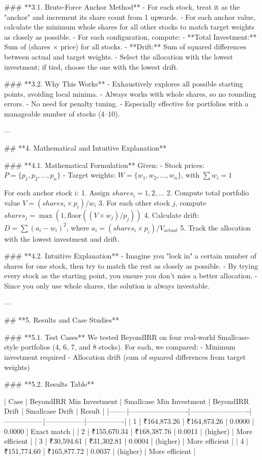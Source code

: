 ### **3.1. Brute-Force Anchor Method**
- For each stock, treat it as the "anchor" and increment its share count from 1 upwards.
- For each anchor value, calculate the minimum whole shares for all other stocks to match target weights as closely as possible.
- For each configuration, compute:
  - **Total Investment:** Sum of (shares × price) for all stocks.
  - **Drift:** Sum of squared differences between actual and target weights.
- Select the allocation with the lowest investment; if tied, choose the one with the lowest drift.

### **3.2. Why This Works**
- Exhaustively explores all possible starting points, avoiding local minima.
- Always works with whole shares, so no rounding errors.
- No need for penalty tuning.
- Especially effective for portfolios with a manageable number of stocks (4–10).

---

## **4. Mathematical and Intuitive Explanation**

### **4.1. Mathematical Formulation**
Given:
- Stock prices: \( P = \{p_1, p_2, ..., p_n\} \)
- Target weights: \( W = \{w_1, w_2, ..., w_n\} \), with \( \sum w_i = 1 \)

For each anchor stock \( i \):
1. Assign \( shares_i = 1, 2, ... \)
2. Compute total portfolio value \( V = (shares_i \times p_i) / w_i \)
3. For each other stock \( j \), compute \( shares_j = \max(1, \text{floor}((V \times w_j) / p_j)) \)
4. Calculate drift: \( D = \sum (a_i - w_i)^2 \), where \( a_i = (shares_i \times p_i) / V_{actual} \)
5. Track the allocation with the lowest investment and drift.

### **4.2. Intuitive Explanation**
- Imagine you "lock in" a certain number of shares for one stock, then try to match the rest as closely as possible.
- By trying every stock as the starting point, you ensure you don't miss a better allocation.
- Since you only use whole shares, the solution is always investable.

---

## **5. Results and Case Studies**

### **5.1. Test Cases**
We tested BeyondIRR on four real-world Smallcase-style portfolios (4, 6, 7, and 8 stocks). For each, we compared:
- Minimum investment required
- Allocation drift (sum of squared differences from target weights)

### **5.2. Results Table**

| Case   | BeyondIRR Min Investment | Smallcase Min Investment | BeyondIRR Drift | Smallcase Drift | Result         |
|--------|-------------------------|-------------------------|-----------------|-----------------|----------------|
| 1      | ₹164,873.26             | ₹164,873.26             | 0.0000          | 0.0000          | Exact match    |
| 2      | ₹155,670.34             | ₹168,387.76             | 0.0011          | (higher)        | More efficient |
| 3      | ₹30,594.61              | ₹31,302.81              | 0.0004          | (higher)        | More efficient |
| 4      | ₹151,774.60             | ₹165,877.72             | 0.0037          | (higher)        | More efficient |

